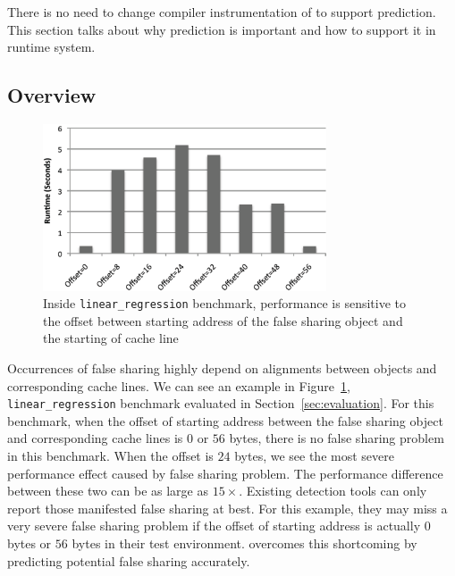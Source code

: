 \label{sec:prediction}
There is no need to change compiler instrumentation of \Predator{} to support prediction.
This section talks about why prediction is important and how to support it in runtime system.  

\subsection{Overview}
\label{sec:predictoverview}

\begin{figure}[!h]
\begin{center}
\includegraphics[width=3.3in]{fig/perfsensitive}
\end{center}
\caption{
Inside \texttt{linear\_regression} benchmark,
performance is sensitive to the offset between starting address of the false sharing object 
and the starting of cache line 
\label{fig:perfsensitive}}
\end{figure}

Occurrences of false sharing highly depend on 
alignments between objects and corresponding cache lines.
We can see an example in Figure~\ref{fig:perfsensitive}, \texttt{linear\_regression} 
benchmark evaluated in Section~\ref{sec:evaluation}. 
For this benchmark,
when the offset of starting address between the false sharing object and corresponding cache lines 
is $0$ or $56$ bytes, 
there is no false sharing problem in this benchmark. 
When the offset is $24$ bytes, we see the most severe performance effect caused 
by false sharing problem. 
The performance difference between these two can be as large as $15\times$.
Existing detection tools can only report those manifested false sharing at best. 
For this example, they may miss a very severe false sharing problem if the offset of starting 
address is actually $0$ bytes or $56$ bytes in their test environment.
\Predator{} overcomes this shortcoming by predicting potential false sharing accurately. 


